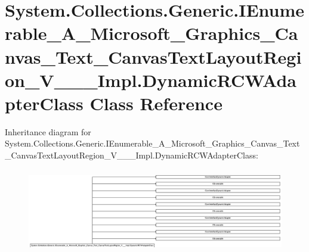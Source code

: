 \hypertarget{class_system_1_1_collections_1_1_generic_1_1_i_enumerable___a___microsoft___graphics___canvas___30fa63407b968b85491a2f316fa074a0}{}\section{System.\+Collections.\+Generic.\+I\+Enumerable\+\_\+\+A\+\_\+\+Microsoft\+\_\+\+Graphics\+\_\+\+Canvas\+\_\+\+Text\+\_\+\+Canvas\+Text\+Layout\+Region\+\_\+\+V\+\_\+\+\_\+\+\_\+\+Impl.\+Dynamic\+R\+C\+W\+Adapter\+Class Class Reference}
\label{class_system_1_1_collections_1_1_generic_1_1_i_enumerable___a___microsoft___graphics___canvas___30fa63407b968b85491a2f316fa074a0}
Inheritance diagram for System.\+Collections.\+Generic.\+I\+Enumerable\+\_\+\+A\+\_\+\+Microsoft\+\_\+\+Graphics\+\_\+\+Canvas\+\_\+\+Text\+\_\+\+Canvas\+Text\+Layout\+Region\+\_\+\+V\+\_\+\+\_\+\+\_\+\+Impl.\+Dynamic\+R\+C\+W\+Adapter\+Class\+:\begin{figure}[H]
\begin{center}
\leavevmode
\includegraphics[height=3.715320cm]{class_system_1_1_collections_1_1_generic_1_1_i_enumerable___a___microsoft___graphics___canvas___30fa63407b968b85491a2f316fa074a0}
\end{center}
\end{figure}
